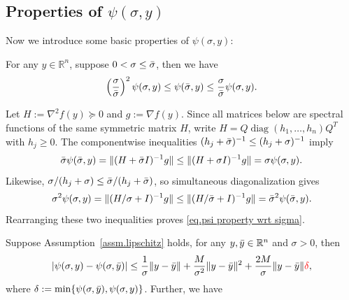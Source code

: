 \documentclass[moor,sglanonrev]{informs4}
\begin{document}
\begin{APPENDICES}
    \subsection*{Properties of $\psi(\sigma,y)$}
    Now we introduce some basic properties of $\psi(\sigma,y)$:
    \begin{lemma}
        \label{lem.psi property wrt sigma}
        For any $y\in\mathbb{R}^n$, suppose $0<\sigma\leq \Bar{\sigma}$, then we have
        \begin{equation}
            \label{eq.psi property wrt sigma}
            \left(\frac{\sigma}{\Bar{\sigma}}\right)^2 \psi(\sigma,y)\leq \psi(\Bar{\sigma},y) \leq \frac{\sigma}{\Bar{\sigma}}\psi(\sigma,y).
        \end{equation}
    \end{lemma}
    Let $H:=\nabla^2 f(y)\succeq0$ and $g:=\nabla f(y)$. Since all matrices below are spectral functions of the same symmetric matrix $H$, write
    \(
        H=Q\operatorname{diag}(h_1,\ldots,h_n)Q^T
    \)
    with $h_j\geq0$. The componentwise inequalities
    \(
        (h_j+\Bar{\sigma})^{-1}\leq(h_j+\sigma)^{-1}
    \)
    imply
    \begin{equation*}
        \Bar{\sigma}\psi(\Bar{\sigma},y)
        =\|(H+\Bar{\sigma}I)^{-1}g\|
        \leq\|(H+\sigma I)^{-1}g\|
        =\sigma\psi(\sigma,y).
    \end{equation*}
    Likewise,
    \(
        \sigma/(h_j+\sigma)\leq
        \Bar{\sigma}/(h_j+\Bar{\sigma})
    \), so simultaneous diagonalization gives
    \begin{equation*}
        \sigma^2\psi(\sigma,y)
        =\|(H/\sigma+I)^{-1}g\|
        \leq\|(H/\Bar{\sigma}+I)^{-1}g\|
        =\Bar{\sigma}^2\psi(\Bar{\sigma},y).
    \end{equation*}
    Rearranging these two inequalities proves \eqref{eq.psi property wrt sigma}.
    \Halmos \endproof
    \begin{lemma}
        \label{lem.psi property wrt y}
        Suppose Assumption~\ref{assm.lipschitz} holds, for any $y,\Bar{y} \in \mathbb{R}^n$ and $\sigma>0$, then
        \begin{equation}
            \label{eq.psi property wrt y}
            \left \vert \psi(\sigma,y)-\psi(\sigma,\Bar{y}) \right\vert \leq \frac{1}{\sigma}\|y-\Bar{y}\| +\frac{M}{\sigma^2}\|y-\Bar{y}\|^2 +\frac{2M}{\sigma}\|y-\Bar{y}\|{\color{red} \delta},
        \end{equation}
        where $\delta:=\min\{\psi(\sigma,\Bar{y}),\psi(\sigma,y)\}$. Further, we have

\end{lemma}
\end{APPENDICES}
\end{document}
